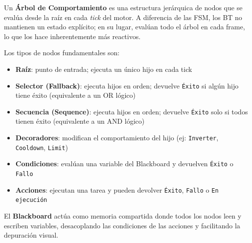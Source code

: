 \documentclass[12pt,letterpaper]{article}
\begin{document}
Un \textbf{Árbol de Comportamiento} es una estructura jerárquica de nodos que se evalúa desde la raíz en cada \textit{tick} del motor. A diferencia de las FSM, los BT no mantienen un estado explícito; en su lugar, evalúan todo el árbol en cada frame, lo que los hace inherentemente más reactivos.

Los tipos de nodos fundamentales son:

\begin{itemize}[nosep]
  \item \textbf{Raíz}: punto de entrada; ejecuta un único hijo en cada tick
  \item \textbf{Selector (Fallback)}: ejecuta hijos en orden; devuelve \texttt{Éxito} si algún hijo tiene éxito (equivalente a un OR lógico)
  \item \textbf{Secuencia (Sequence)}: ejecuta hijos en orden; devuelve \texttt{Éxito} solo si todos tienen éxito (equivalente a un AND lógico)
  \item \textbf{Decoradores}: modifican el comportamiento del hijo (ej: \texttt{Inverter}, \texttt{Cooldown}, \texttt{Limit})
  \item \textbf{Condiciones}: evalúan una variable del Blackboard y devuelven \texttt{Éxito} o \texttt{Fallo}
  \item \textbf{Acciones}: ejecutan una tarea y pueden devolver \texttt{Éxito}, \texttt{Fallo} o \texttt{En ejecución}
\end{itemize}

El \textbf{Blackboard} actúa como memoria compartida donde todos los nodos leen y escriben variables, desacoplando las condiciones de las acciones y facilitando la depuración visual.
\end{document}
